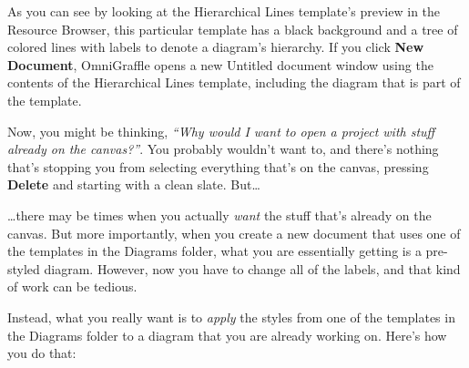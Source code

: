 \documentclass[../main.tex]{subfiles}
\begin{document}

As you can see by looking at the Hierarchical Lines template's preview in the Resource Browser,
this particular template has a black background and a tree of colored lines with labels to
denote a diagram's hierarchy. If you click \textbf{New Document}, OmniGraffle opens a new
Untitled document window using the contents of the Hierarchical Lines template, including the
diagram that is part of the template.


Now, you might be thinking, \textit{``Why would I want to open a project with stuff already on
the canvas?''}. You probably wouldn't want to, and there's nothing that's stopping you from
selecting everything that's on the canvas, pressing \textbf{Delete} and starting with a clean
slate. But\ldots{}

\ldots{}there may be times when you actually \textit{want} the stuff that's already on the
canvas. But more importantly, when you create a new document that uses one of the templates in
the Diagrams folder, what you are essentially getting is a pre-styled diagram. However, now
you have to change all of the labels, and that kind of work can be tedious.

Instead, what you really want is to \textit{apply} the styles from one of the templates in the
Diagrams folder to a diagram that you are already working on. Here's how you do that:
\end{document}
